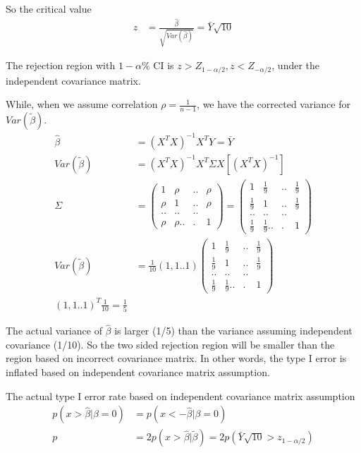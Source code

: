 \documentclass[11pt]{article} %
\begin{document}
\begin{itemize}
So the critical value 
\begin{align*}
	z &= \frac{\hat{\beta} }{\sqrt{Var(\hat{\beta})}}  =  \bar{Y} \sqrt{10}
\end{align*}

The rejection region with $1-\alpha \%$ CI is $z > Z_{1-\alpha/2}, z < Z_{-\alpha/2}$, under the independent covariance matrix.


While, when we assume correlation $\rho = \frac{1}{n-1}$, we have the corrected variance for $Var(\tilde{\beta} )$. 
\begin{align*}
	\hat{\beta}  &=  (X^T X)^{-1}X^T Y = \bar{Y}\\
	Var(\tilde{\beta} ) &= (X^T X)^{-1}X^T \Sigma X [(X^T X)^{-1}]  \\
	\Sigma &= \begin{pmatrix}
		1 & \rho &.. & \rho \\
		\rho & 1 &.. & \rho\\
		.. &.. & ..& \\
		\rho & \rho ..&. & 1 
	\end{pmatrix} = \begin{pmatrix}
		1 & \frac{1}{9} &.. & \frac{1}{9} \\
		\frac{1}{9}  & 1 &.. & \frac{1}{9} \\
		.. &.. & ..& \\
		\frac{1}{9}  & \frac{1}{9}  ..&. & 1 
	\end{pmatrix} \\
	Var(\tilde{\beta} ) &= \frac{1}{10} (1,1..1) \begin{pmatrix}
		1 & \frac{1}{9} &.. & \frac{1}{9} \\
		\frac{1}{9}  & 1 &.. & \frac{1}{9} \\
		.. &.. & ..& \\
		\frac{1}{9}  & \frac{1}{9}  ..&. & 1 
	\end{pmatrix} \\ (1,1..1)^T \frac{1}{10}  = \frac{1}{5}
\end{align*}

The actual variance of $\hat{\beta}$ is larger (1/5) than the variance assuming independent covariance (1/10). So the two sided rejection region will be smaller than the region based on incorrect covariance matrix. In other words, the type I error is inflated based on independent covariance matrix assumption.

The actual type I error rate based on independent covariance matrix assumption
\begin{align*}
	p(x > \hat{\beta} | \beta = 0) &= p(x <- \hat{\beta} |  \beta = 0) \\
	p &= 2 p(x> \hat{\beta} | \tilde{\beta}) = 2 p(\bar{Y} \sqrt{10} > z_{1-\alpha/2})
\end{align*}


\end{itemize}
\end{document}
